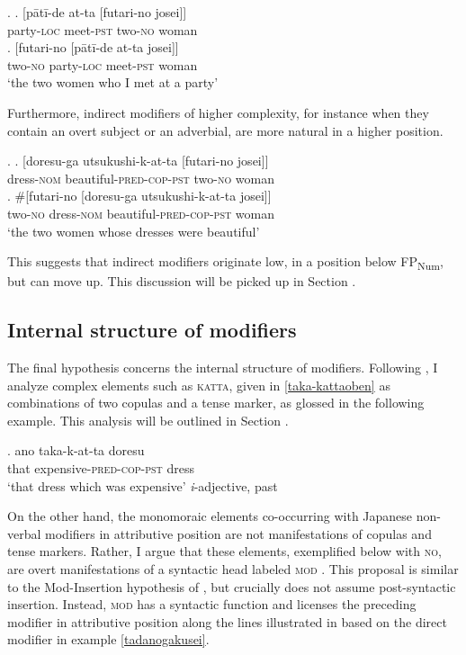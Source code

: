 \ex. \ag. [pātī-de at-ta [futari-no josei]]\\
party-\textsc{loc} meet-\textsc{pst} two-\textsc{no} woman\\
\bg. [futari-no [pātī-de at-ta josei]]\\
two-\textsc{no} party-\textsc{loc} meet-\textsc{pst} woman\\
`the two women who I met at a party'

Furthermore, indirect modifiers of higher complexity, for instance when they contain an overt subject or an adverbial, are more natural in a higher position.

\ex. \ag. [doresu-ga utsukushi-k-at-ta [futari-no josei]]\\
dress-\textsc{nom} beautiful-\textsc{pred-cop-pst} two-\textsc{no} woman\\
\bg. \#[futari-no [doresu-ga utsukushi-k-at-ta josei]]\\
two-\textsc{no} dress-\textsc{nom} beautiful-\textsc{pred-cop-pst} woman\\
`the two women whose dresses were beautiful'

This suggests that indirect modifiers originate low, in a position below FP\textsubscript{Num}, but can move up. This discussion will be picked up in Section .

\subsection{Internal structure of modifiers}

The final hypothesis concerns the internal structure of modifiers. Following \citet{nishiyama:1999:adj}, I analyze complex elements such as \textsc{katta}, given in \ref{taka-kattaoben} as combinations of two copulas and a tense marker, as glossed in the following example. This analysis will be outlined in Section .

\exg. ano taka-k-at-ta doresu\\
that expensive-\textsc{pred-cop-pst} dress\\
`that dress which was expensive' \null \hfill \textit{i}-adjective, past

On the other hand, the monomoraic elements co-occurring with Japanese non-verbal modifiers in attributive position are not manifestations of copulas and tense markers. Rather, I argue that these elements, exemplified below with \textsc{no}, are overt manifestations of a syntactic head labeled \textsc{mod} \citep{rubin:1994:mod}. This proposal is similar to the Mod-Insertion hypothesis of \citet{kitagawa:1982:prenominal}, but crucially does not assume post-syntactic insertion. Instead, \textsc{mod} has a syntactic function and licenses the preceding modifier in attributive position along the lines illustrated in  based on the direct modifier in example \ref{tadanogakusei}.

